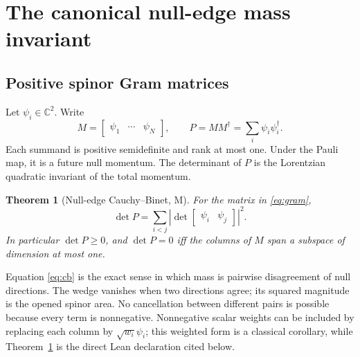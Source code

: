 \documentclass[11pt]{article}
\newcommand{\Mtag}{\textcolor{verified}{\textsc{M}}}
\newcommand{\C}{\mathbb{C}}
\newtheorem{theorem}{Theorem}[section]
\begin{document}
\section{The canonical null-edge mass invariant}

\subsection{Positive spinor Gram matrices}

Let $\psi_i\in\C^2$.  Write
\begin{equation}\label{eq:gram}
  M=\begin{bmatrix}\psi_1&\cdots&\psi_N\end{bmatrix},
  \qquad P=MM^\dagger=\sum_i\psi_i\psi_i^\dagger.
\end{equation}
Each summand is positive semidefinite and rank at most one.  Under the Pauli
map, it is a future null momentum.  The determinant of $P$ is the Lorentzian
quadratic invariant of the total momentum.

\begin{theorem}[Null-edge Cauchy--Binet, \Mtag]\label{thm:cb}
For the matrix in \eqref{eq:gram},
\begin{equation}\label{eq:cb}
  \det P=\sum_{i<j}
  \left|\det\begin{bmatrix}\psi_i&\psi_j\end{bmatrix}\right|^2.
\end{equation}
In particular $\det P\geq0$, and $\det P=0$ iff the columns of $M$ span a
subspace of dimension at most one.
\end{theorem}

Equation \eqref{eq:cb} is the exact sense in which mass is pairwise disagreement
of null directions.  The wedge vanishes when two directions agree; its squared
magnitude is the opened spinor area.  No cancellation between different pairs
is possible because every term is nonnegative.
Nonnegative scalar weights can be included by replacing each column by
$\sqrt{w_i}\psi_i$; this weighted form is a classical corollary, while
Theorem~\ref{thm:cb} is the direct Lean declaration cited below.
\end{document}
